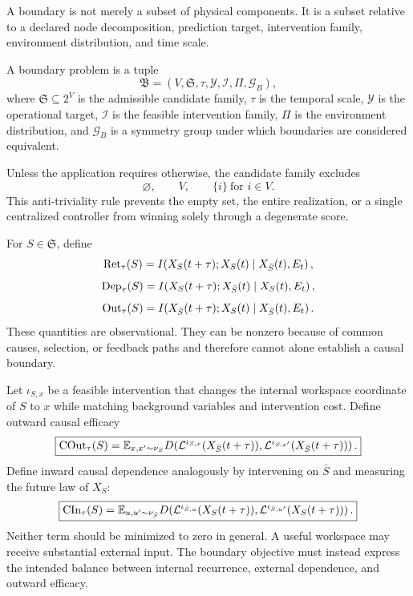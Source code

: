 

A boundary is not merely a subset of physical components. It is a subset
relative to a declared node decomposition, prediction target, intervention
family, environment distribution, and time scale.

\begin{definition}\label{def:boundary-problem}
A boundary problem is a tuple
\[
\mathfrak B
=
\left(
V,
\mathfrak S,
\tau,
\mathcal Y,
\mathcal I,
\Pi,
\mathcal G_B
\right),
\]
where \(\mathfrak S\subseteq2^V\) is the admissible candidate family,
\(\tau\) is the temporal scale, \(\mathcal Y\) is the operational target,
\(\mathcal I\) is the feasible intervention family, \(\Pi\) is the
environment distribution, and \(\mathcal G_B\) is a symmetry group under
which boundaries are considered equivalent.
\end{definition}

Unless the application requires otherwise, the candidate family excludes
\[
\varnothing,
\qquad
V,
\qquad
\{i\}\ \text{for }i\in V.
\]
This anti-triviality rule prevents the empty set, the entire realization, or a
single centralized controller from winning solely through a degenerate score.


For \(S\in\mathfrak S\), define
\[
\operatorname{Ret}_\tau(S)
=
I\!\left(
X_S(t+\tau);X_S(t)
\mid X_{\bar S}(t),E_t
\right),
\]
\[
\operatorname{Dep}_\tau(S)
=
I\!\left(
X_S(t+\tau);X_{\bar S}(t)
\mid X_S(t),E_t
\right),
\]
\[
\operatorname{Out}_\tau(S)
=
I\!\left(
X_{\bar S}(t+\tau);X_S(t)
\mid X_{\bar S}(t),E_t
\right).
\]
These quantities are observational. They can be nonzero because of common
causes, selection, or feedback paths and therefore cannot alone establish a
causal boundary.


Let \(\iota_{S,x}\) be a feasible intervention that changes the internal
workspace coordinate of \(S\) to \(x\) while matching background variables and
intervention cost. Define outward causal efficacy
\[
\boxed{
\operatorname{COut}_\tau(S)
=
\mathbb E_{x,x'\sim\nu_S}
D\!\left(
\mathcal L^{\iota_{S,x}}
(X_{\bar S}(t+\tau)),
\mathcal L^{\iota_{S,x'}}
(X_{\bar S}(t+\tau))
\right).
}
\]
Define inward causal dependence analogously by intervening on \(\bar S\) and
measuring the future law of \(X_S\):
\[
\boxed{
\operatorname{CIn}_\tau(S)
=
\mathbb E_{u,u'\sim\nu_{\bar S}}
D\!\left(
\mathcal L^{\iota_{\bar S,u}}
(X_S(t+\tau)),
\mathcal L^{\iota_{\bar S,u'}}
(X_S(t+\tau))
\right).
}
\]
Neither term should be minimized to zero in general. A useful workspace may
receive substantial external input. The boundary objective must instead
express the intended balance between internal recurrence, external dependence,
and outward efficacy.


